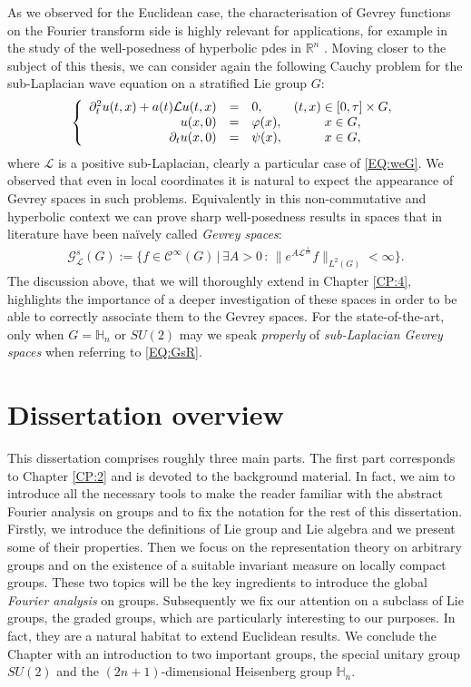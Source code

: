 \documentclass[12pt,oneside,a4paper]{book}
\numberwithin{equation}{section}     %
\theoremstyle{plain}
\theoremstyle{definition}
\newcommand{\R}{{\mathbb R}}
\newcommand{\Rn}{{\R}^n}
\newcommand{\slp}{{\mathcal L}}
\begin{document}
As we observed for the Euclidean case, the characterisation of Gevrey functions on the Fourier transform side is highly relevant for applications, for example in the study of the well-posedness of hyperbolic pdes in $\Rn$ 
\cite{CDS79}. Moving closer to the subject of this thesis, we can consider again the following Cauchy problem for the sub-Laplacian wave equation on a stratified Lie group $G$:
\begin{equation}\notag
\left\{\begin{array}{rclc}
\partial ^2_{t}u(t,x)+a(t)\slp u(t,x)	&=&0,			&(t,x)\in [0,\tau]\times G,\\
u(x,0)	&=&\varphi(x),	&x\in G,\\
\partial _t u(x,0)	&=&\psi(x),		&x\in G,
\end{array}\right.
\end{equation}  
where $\slp$ is a positive sub-Laplacian, clearly a particular case of \eqref{EQ:weG}. We observed that even in local coordinates it is natural to expect the appearance of Gevrey spaces in such problems. Equivalently in this non-commutative and hyperbolic context we can prove sharp well-posedness results in spaces that in literature have been na\"ively called \textit{Gevrey spaces}:
\begin{align}\label{EQ:GsR}
\mathcal G^s_{\slp}(G):=\{f\in\mathcal{C}^\infty(G)\,|\,\exists A>0\,:\,\|e^{A\slp^{\frac{1}{\nu s}}}f\|_{L^2(G)}<\infty\}.
\end{align}
The discussion above, that we will thoroughly extend in Chapter \ref{CP:4}, highlights the importance of a deeper investigation of these spaces in order to be able to correctly associate them to the Gevrey spaces. For the state-of-the-art, only when $G=\mathbb{H}_n$ or $SU(2)$ may we speak \textit{properly} of \textit{sub-Laplacian Gevrey spaces} when referring to \eqref{EQ:GsR}.


\section{Dissertation overview}
This dissertation comprises roughly three main parts. 
The first part corresponds to Chapter \ref{CP:2} and is devoted to the background material. In fact, we aim  to introduce all the necessary tools to make the reader familiar with the abstract Fourier analysis on groups and to fix the notation for the rest of this dissertation. Firstly, we introduce the definitions of Lie group and Lie algebra and we present some of their properties. Then we focus on the representation theory on arbitrary groups and on the existence of a suitable invariant measure on locally compact groups. These two topics will be the key ingredients to introduce the global \textit{Fourier analysis} on groups. Subsequently we fix our attention on a subclass of Lie groups, the graded groups, which are particularly interesting to our purposes. In fact, they are a natural habitat to extend Euclidean results. We conclude the Chapter with an introduction to two important groups, the special unitary group $SU(2)$ and the $(2n+1)$-dimensional Heisenberg group $\mathbb {H}_n$. 
\end{document}
